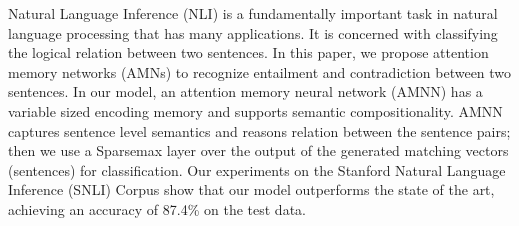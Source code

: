 Natural Language Inference (NLI) is a fundamentally important task in natural language processing that has many applications. It is concerned with classifying the logical relation between two sentences. In this paper, we propose attention memory networks (AMNs) to recognize entailment and contradiction between two sentences. In our model, an attention memory neural network (AMNN) has a variable sized encoding memory and supports semantic compositionality. AMNN captures sentence level semantics and reasons relation between the sentence pairs; then we use a Sparsemax layer over the output of the generated matching vectors (sentences) for classification. Our experiments on the Stanford Natural Language Inference (SNLI) Corpus show that our model outperforms the state of the art, achieving an accuracy of 87.4\% on the test data.
